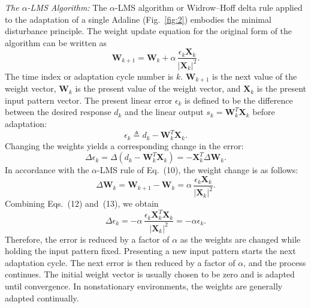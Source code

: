 \documentclass[10pt,twocolumn]{article}
\newcommand{\X}{\bm{X}}
\newcommand{\W}{\bm{W}}
\begin{document}
\textit{The $\alpha$-LMS Algorithm:} The $\alpha$-LMS algorithm or Widrow--Hoff
delta rule applied to the adaptation of a single Adaline (Fig.~\ref{fig:2})
embodies the minimal disturbance principle. The weight update equation for the
original form of the algorithm can be written as
\begin{equation}
\W_{k+1} = \W_k + \alpha\,\frac{\epsilon_k \X_k}{|\X_k|^2}. \tag{10}
\end{equation}
The time index or adaptation cycle number is $k$. $\W_{k+1}$ is the next value of
the weight vector, $\W_k$ is the present value of the weight vector, and $\X_k$
is the present input pattern vector. The present linear error $\epsilon_k$ is
defined to be the difference between the desired response $d_k$ and the linear
output $s_k = \W_k^{T}\X_k$ before adaptation:
\begin{equation}
\epsilon_k \triangleq d_k - \W_k^{T}\X_k. \tag{11}
\end{equation}
Changing the weights yields a corresponding change in the error:
\begin{equation}
\Delta\epsilon_k = \Delta(d_k - \W_k^{T}\X_k) = -\X_k^{T}\Delta\W_k. \tag{12}
\end{equation}
In accordance with the $\alpha$-LMS rule of Eq.~(10), the weight change is as
follows:
\begin{equation}
\Delta\W_k = \W_{k+1}-\W_k = \alpha\,\frac{\epsilon_k \X_k}{|\X_k|^2}. \tag{13}
\end{equation}
Combining Eqs.~(12) and~(13), we obtain
\begin{equation}
\Delta\epsilon_k = -\alpha\,\frac{\epsilon_k \X_k^{T}\X_k}{|\X_k|^2} = -\alpha\epsilon_k. \tag{14}
\end{equation}
Therefore, the error is reduced by a factor of $\alpha$ as the weights are changed
while holding the input pattern fixed. Presenting a new input pattern starts the
next adaptation cycle. The next error is then reduced by a factor of $\alpha$, and
the process continues. The initial weight vector is usually chosen to be zero and
is adapted until convergence. In nonstationary environments, the weights are
generally adapted continually.
\end{document}
